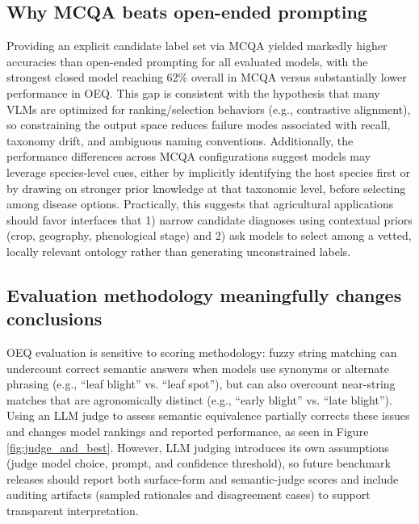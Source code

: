 \documentclass[10pt,letterpaper]{article}
\begin{document}
\subsection{Why MCQA beats open-ended prompting}
Providing an explicit candidate label set via MCQA yielded markedly higher accuracies than open-ended prompting for all evaluated models, with the strongest closed model reaching 62\% overall in MCQA versus substantially lower performance in OEQ. This gap is consistent with the hypothesis that many VLMs are optimized for ranking/selection behaviors (e.g., contrastive alignment), so constraining the output space reduces failure modes associated with recall, taxonomy drift, and ambiguous naming conventions. Additionally, the performance differences across MCQA configurations suggest models may leverage species-level cues, either by implicitly identifying the host species first or by drawing on stronger prior knowledge at that taxonomic level, before selecting among disease options. Practically, this suggests that agricultural applications should favor interfaces that 1) narrow candidate diagnoses using contextual priors (crop, geography, phenological stage) and 2) ask models to select among a vetted, locally relevant ontology rather than generating unconstrained labels.

\subsection{Evaluation methodology meaningfully changes conclusions}
OEQ evaluation is sensitive to scoring methodology: fuzzy string matching can undercount correct semantic answers when models use synonyms or alternate phrasing (e.g., “leaf blight” vs. “leaf spot”), but can also overcount near-string matches that are agronomically distinct (e.g., “early blight” vs. “late blight”). Using an LLM judge to assess semantic equivalence partially corrects these issues and changes model rankings and reported performance, as seen in Figure \ref{fig:judge_and_best}. However, LLM judging introduces its own assumptions (judge model choice, prompt, and confidence threshold), so future benchmark releases should report both surface-form and semantic-judge scores and include auditing artifacts (sampled rationales and disagreement cases) to support transparent interpretation.
\end{document}
